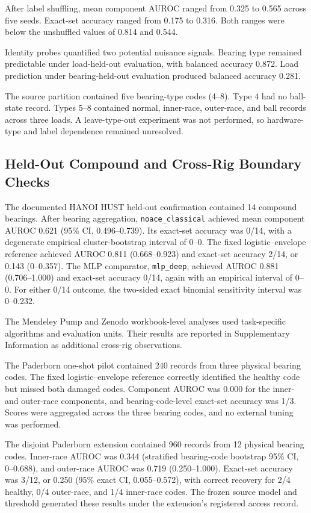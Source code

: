 \documentclass[machines,article,submit,oneauthor,pdftex]{Definitions/mdpi}
\begin{document}
After label shuffling, mean component AUROC ranged from 0.325 to 0.565 across five seeds. Exact-set accuracy ranged from 0.175 to 0.316. Both ranges were below the unshuffled values of 0.814 and 0.544.

Identity probes quantified two potential nuisance signals. Bearing type remained predictable under load-held-out evaluation, with balanced accuracy 0.872. Load prediction under bearing-held-out evaluation produced balanced accuracy 0.281.

The source partition contained five bearing-type codes (4--8). Type 4 had no ball-state record. Types 5--8 contained normal, inner-race, outer-race, and ball records across three loads. A leave-type-out experiment was not performed, so hardware-type and label dependence remained unresolved.

\subsection{Held-Out Compound and Cross-Rig Boundary Checks}

The documented HANOI HUST held-out confirmation contained 14 compound bearings. After bearing aggregation, \texttt{noace\_classical} achieved mean component AUROC 0.621 (95\% CI, 0.496--0.739). Its exact-set accuracy was 0/14, with a degenerate empirical cluster-bootstrap interval of 0--0. The fixed logistic--envelope reference achieved AUROC 0.811 (0.668--0.923) and exact-set accuracy 2/14, or 0.143 (0--0.357). The MLP comparator, \texttt{mlp\_deep}, achieved AUROC 0.881 (0.706--1.000) and exact-set accuracy 0/14, again with an empirical interval of 0--0. For either 0/14 outcome, the two-sided exact binomial sensitivity interval was 0--0.232.

The Mendeley Pump and Zenodo workbook-level analyses used task-specific algorithms and evaluation units. Their results are reported in Supplementary Information as additional cross-rig observations.

The Paderborn one-shot pilot contained 240 records from three physical bearing codes. The fixed logistic--envelope reference correctly identified the healthy code but missed both damaged codes. Component AUROC was 0.000 for the inner- and outer-race components, and bearing-code-level exact-set accuracy was 1/3. Scores were aggregated across the three bearing codes, and no external tuning was performed.

The disjoint Paderborn extension contained 960 records from 12 physical bearing codes. Inner-race AUROC was 0.344 (stratified bearing-code bootstrap 95\% CI, 0--0.688), and outer-race AUROC was 0.719 (0.250--1.000). Exact-set accuracy was 3/12, or 0.250 (95\% exact CI, 0.055--0.572), with correct recovery for 2/4 healthy, 0/4 outer-race, and 1/4 inner-race codes. The frozen source model and threshold generated these results under the extension's registered access record.
\end{document}
